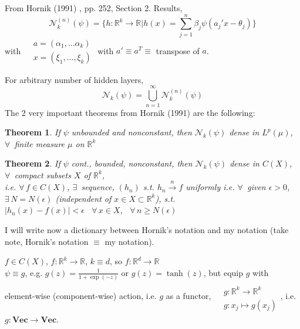 \documentclass[10pt]{amsart}
\newtheorem{theorem}{Theorem}
\begin{document}
\begin{multicols*}{2}
From Hornik (1991) \cite{Horn1991}, pp. 252, Section 2. Results,
\begin{equation}
  \mathcal{N}_k^{(n)}(\psi)  = \lbrace h :\mathbb{R}^k \to \mathbb{R} | h(x) =\sum_{j=1}^n \beta_j \psi(a_j'x- \theta_j) \rbrace
\end{equation}
with
$\begin{aligned}
  & a = (\alpha_1 , \dots \alpha_k) \\ 
 & x = ( \xi_1, \dots, \xi_k) 
  \end{aligned}
$ with $a' \equiv a^T \equiv $ transpose of $a$.  

For arbitrary number of hidden layers,
\[
\mathcal{N}_k(\psi) = \bigcup_{n=1}^{\infty}\mathcal{N}_k^{(n)}(\psi)
\]
The 2 very important theorems from Hornik (1991) are the following:
\begin{theorem}
If $\psi$ unbounded and nonconstant, then $\mathcal{N}_k(\psi)$ dense in $L^p(\mu)$, $\forall \, $ finite measure $\mu$ on $\mathbb{R}^k$
\end{theorem}
\begin{theorem}
  If $\psi$ cont., bounded, nonconstant, then $\mathcal{N}_k(\psi)$ dense in $C(X)$, \, $\forall \,$ compact subsets $X$ of $\mathbb{R}^k$, \\
  i.e. $\forall \, f\in C(X)$, $\exists \, $ sequence, $(h_n)$ s.t. $h_n \xrightarrow{n} f$ uniformly i.e. $\forall \, $ given $\epsilon >0$, $\exists \, N=N(\epsilon)$ (independent of $x\in X\subset \mathbb{R}^k$), s.t. \\
  $|h_n(x)-f(x)| < \epsilon$ \, $\forall \, x \in X$, \, $\forall \, n \geq N(\epsilon)$
  \end{theorem}
I will write now a dictionary between Hornik's notation and my notation (take note, Hornik's notation $\equiv$ my notation).  

$f\in C(X)$, $f:\mathbb{R}^k\to \mathbb{R}$, $k\equiv d$, so $f:\mathbb{R}^d \to \mathbb{R}$ \\
 
$\psi \equiv g$, e.g. $g(z) = \frac{1}{1 + \exp{(-z)} }$ or $g(z) = \tanh{(z)}$, but equip $g$ with element-wise (component-wise) action, i.e. $g$ as a functor, $\begin{aligned} & \quad \\ 
    & g:\mathbb{R}^k \to \mathbb{R}^k \\
    & g:x_j\mapsto g(x_j) \end{aligned}$, i.e. $g: \mathbf{Vec} \to \mathbf{Vec}$.



\end{multicols*}
\end{document}
